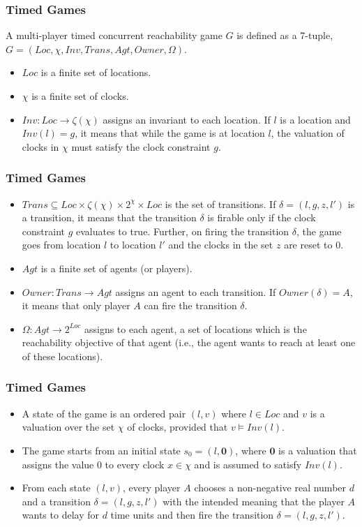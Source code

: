 \documentclass{beamer}
\begin{document}
\begin{frame}
\frametitle{Timed Games}
\begin{definition}
A multi-player timed concurrent reachability game $G$ is defined as a 7-tuple, $G = (Loc, \chi, Inv, Trans, Agt, Owner, \Omega)$.
\end{definition}
\begin{itemize}
\item $Loc$ is a finite set of locations.
\item $\chi$ is a finite set of clocks.
\item $Inv: Loc \rightarrow \zeta(\chi)$ assigns an invariant to each location. If $l$ is a location and $Inv(l) = g$, it means that while the game is at location $l$, the valuation of clocks in $\chi$ must satisfy the clock constraint $g$.
\end{itemize}
\end{frame}

\begin{frame}
\frametitle{Timed Games}
\begin{itemize}
\item $Trans \subseteq Loc \times \zeta(\chi) \times 2^{\chi} \times Loc$ is the set of transitions. If $\delta = (l, g, z, l')$ is a transition, it means that the transition $\delta$ is firable only if the clock constraint $g$ evaluates to true. Further, on firing the transition $\delta$, the game goes from location $l$ to location $l'$ and the clocks in the set $z$ are reset to $0$.
\item $Agt$ is a finite set of agents (or players).
\item $Owner: Trans \rightarrow Agt$ assigns an agent to each transition. If $Owner(\delta) = A$, it means that only player $A$ can fire the transition $\delta$.
\item $\Omega: Agt \rightarrow 2^{Loc}$ assigns to each agent, a set of locations which is the reachability objective of that agent (i.e., the agent wants to reach at least one of these locations).
\end{itemize}
\end{frame}

\begin{frame}
\frametitle{Timed Games}
\begin{itemize}
\item A state of the game is an ordered pair $(l, v)$ where $l \in Loc$ and $v$ is a valuation over the set $\chi$ of clocks, provided that $v \models Inv(l)$.
\item The game starts from an initial state $s_{0} = (l, \textbf{0})$, where $\textbf{0}$ is a valuation that assigns the value $0$ to every clock $x \in \chi$ and is assumed to satisfy $Inv(l)$.
\item From each state $(l, v)$, every player $A$ chooses a non-negative real number $d$ and a transition $\delta = (l, g, z, l')$ with the intended meaning that the player $A$ wants to delay for $d$ time units and then fire the transition $\delta = (l, g, z, l')$.
\end{itemize}
\end{frame}
\end{document}
